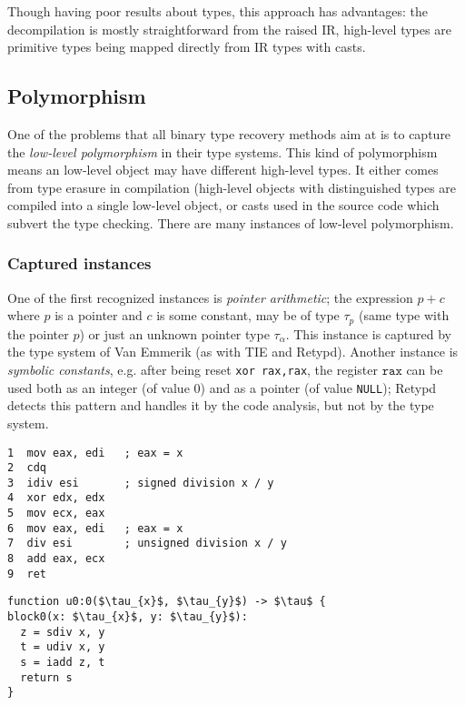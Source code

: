 \documentclass[compsoc,conference,a4paper,10pt,times]{IEEEtran}
\begin{document}
Though having poor results about types, this approach has advantages: the decompilation is mostly
straightforward from the raised IR, high-level types are primitive types being mapped directly from IR types 
with casts.

\subsection{Polymorphism}\label{subsec:polymorphism}
\noindent
One of the problems that all binary type recovery methods aim at is to capture the
\emph{low-level polymorphism} in their type systems. This kind of polymorphism means an
low-level object may have different high-level types. It either comes from 
\raisebox{.5pt}{\textcircled{\raisebox{-.9pt} {1}}} type erasure in
compilation (high-level objects with distinguished types are compiled into a
single low-level object, or \raisebox{.5pt}{\textcircled{\raisebox{-.9pt} {2}}} 
casts used in the source code which subvert the type checking. There are many 
instances of low-level polymorphism.

\subsubsection*{Captured instances} 
One of the first recognized instances is \emph{pointer arithmetic}; 
the expression $p + c$ where $p$ is a pointer and $c$ is some constant, may be of type $\tau_{p}$ (same type with the pointer
$p$) or just an unknown pointer type $\tau_{\alpha}$. This instance is captured by the type system
of Van Emmerik (as with TIE and Retypd). Another instance is \emph{symbolic constants}, e.g. after being reset
\texttt{\small xor rax,rax},
the register $\mathtt{rax}$ can be used both as an integer (of value $0$) and as a pointer
(of value \texttt{NULL}); Retypd detects this pattern and handles it by the code analysis, but not by
the type system.

\begin{lstlisting}[language={[x86masm]Assembler},caption={Signed and unsigned division},label={lst:divisionasm}]
1  mov eax, edi   ; eax = x
2  cdq
3  idiv esi       ; signed division x / y
4  xor edx, edx
5  mov ecx, eax
6  mov eax, edi   ; eax = x
7  div esi        ; unsigned division x / y
8  add eax, ecx
9  ret
\end{lstlisting}
\begin{lstlisting}[style={cranelift},mathescape=true,caption={Signed and unsigned division (cranelift)},label={lst:divisionclift}]
function u0:0($\tau_{x}$, $\tau_{y}$) -> $\tau$ {
block0(x: $\tau_{x}$, y: $\tau_{y}$):
  z = sdiv x, y
  t = udiv x, y 
  s = iadd z, t
  return s
}
\end{lstlisting}
\end{document}
